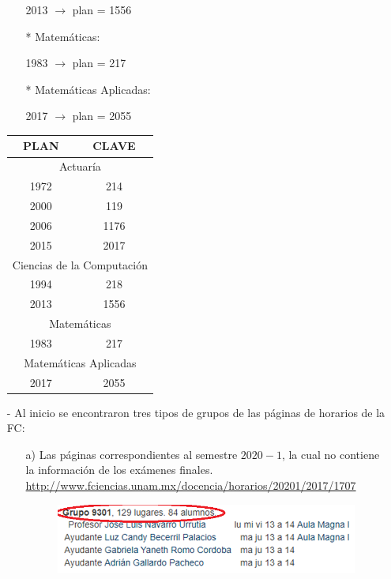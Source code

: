 \documentclass[12pt,spanish]{report}
\begin{document}
\begin{itemize}
\begin{itemize}
2013 $\rightarrow$ plan = 1556

\item[*] Matemáticas:

1983 $\rightarrow$ plan = 217

\item[*] Matemáticas Aplicadas:

2017 $\rightarrow$ plan = 2055
\end{itemize}


\begin{table}[H]
\centering
\begin{tabular}{|c|c|}
 \hline 
  PLAN & CLAVE \\ 
 \hline 
 \multicolumn{2}{|c|}{Actuaría} \\ 
 \hline 
 1972 & 214 \\ 
 \hline 
 2000 & 119 \\ 
 \hline 
 2006 & 1176 \\ 
 \hline 
 2015 & 2017 \\ 
 \hline 
 \multicolumn{2}{|c|}{Ciencias de la Computación} \\ 
 \hline 
 1994 & 218 \\ 
 \hline 
 2013 & 1556 \\ 
 \hline 
 \multicolumn{2}{|c|}{Matemáticas} \\ 
 \hline 
 1983 & 217 \\ 
 \hline 
 \multicolumn{2}{|c|}{Matemáticas Aplicadas} \\ 
 \hline 
 2017 & 2055 \\ 
 \hline 
 \end{tabular}  
\end{table}



\item[-] Al inicio se encontraron tres tipos de grupos de las páginas de horarios de la FC:

\begin{enumerate}
\item[a)] Las páginas correspondientes al semestre $2020-1$, la cual no contiene la información de los exámenes finales. \url{http://www.fciencias.unam.mx/docencia/horarios/20201/2017/1707}

\begin{figure}[H]
\centering
\includegraphics[scale = 0.45]{GrupoA} %
\end{figure}



\end{enumerate}
\end{itemize}
\end{document}
